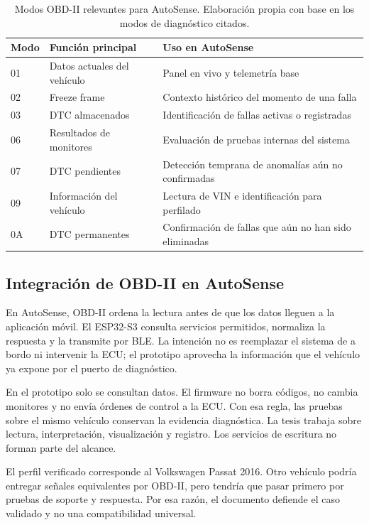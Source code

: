 \documentclass[12pt,letterpaper]{report}
\begin{document}
\begin{table}[!htbp]
    \centering
    \caption{Modos OBD-II relevantes para AutoSense. Elaboración propia con base en los modos de diagnóstico citados.}
    \label{tab:modos-obd2-autosense}
    \small
    \begin{tabular}{p{}p{}p{}}
        \toprule
        Modo & Función principal & Uso en AutoSense \\
        \midrule
        01 & Datos actuales del vehículo & Panel en vivo y telemetría base \\
        02 & Freeze frame & Contexto histórico del momento de una falla \\
        03 & DTC almacenados & Identificación de fallas activas o registradas \\
        06 & Resultados de monitores & Evaluación de pruebas internas del sistema \\
        07 & DTC pendientes & Detección temprana de anomalías aún no confirmadas \\
        09 & Información del vehículo & Lectura de VIN e identificación para perfilado \\
        0A & DTC permanentes & Confirmación de fallas que aún no han sido eliminadas \\
        \bottomrule
    \end{tabular}
\end{table}

\subsection{Integración de OBD-II en AutoSense}

En AutoSense, OBD-II ordena la lectura antes de que los datos lleguen a la aplicación móvil. El ESP32-S3 consulta servicios permitidos, normaliza la respuesta y la transmite por BLE. La intención no es reemplazar el sistema de a bordo ni intervenir la ECU; el prototipo aprovecha la información que el vehículo ya expone por el puerto de diagnóstico.

En el prototipo solo se consultan datos. El firmware no borra códigos, no cambia monitores y no envía órdenes de control a la ECU. Con esa regla, las pruebas sobre el mismo vehículo conservan la evidencia diagnóstica. La tesis trabaja sobre lectura, interpretación, visualización y registro. Los servicios de escritura no forman parte del alcance.

El perfil verificado corresponde al Volkswagen Passat 2016. Otro vehículo podría entregar señales equivalentes por OBD-II, pero tendría que pasar primero por pruebas de soporte y respuesta. Por esa razón, el documento defiende el caso validado y no una compatibilidad universal.
\end{document}
